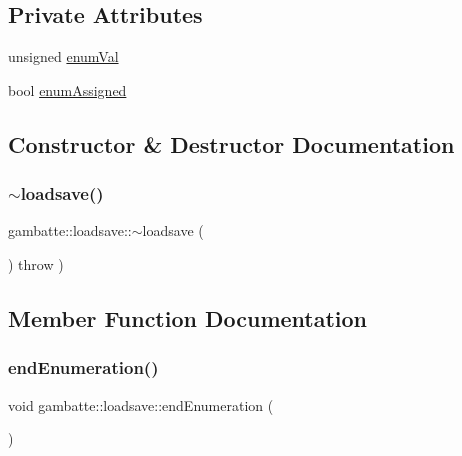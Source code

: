 \subsection*{Private Attributes}
\begin{DoxyCompactItemize}
\item 
unsigned \hyperlink{classgambatte_1_1loadsave_a4879654f0e5d4751b6ff6797778f3247}{enum\+Val}
\item 
bool \hyperlink{classgambatte_1_1loadsave_a7c680a9fcfcffab3f7cdb137125830f7}{enum\+Assigned}
\end{DoxyCompactItemize}


\subsection{Constructor \& Destructor Documentation}
\mbox{\label{classgambatte_1_1loadsave_a96a8c63427797752e26a03b4a1c2c495}} 
\subsubsection{\texorpdfstring{$\sim$loadsave()}{~loadsave()}}
{\footnotesize\ttfamily gambatte\+::loadsave\+::$\sim$loadsave (\begin{DoxyParamCaption}{ }\end{DoxyParamCaption}) throw  ) \hspace{0.3cm}{\ttfamily [virtual]}}



\subsection{Member Function Documentation}
\mbox{\label{classgambatte_1_1loadsave_a2fd5b7f803fc455d40921d815e07a50d}} 
\subsubsection{\texorpdfstring{end\+Enumeration()}{endEnumeration()}}
{\footnotesize\ttfamily void gambatte\+::loadsave\+::end\+Enumeration (\begin{DoxyParamCaption}{ }\end{DoxyParamCaption})\hspace{0.3cm}{\ttfamily [inline]}}

